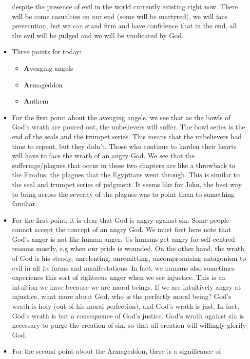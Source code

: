 \begin{itemize}
{\begin{itemize}
{    despite the presence of evil in the world currently existing right now.
    There will be come casualties on our end (some will be martyred), we will
    face persecution, but we can stand firm and have confidence that in the end, all the evil will be judged and we will be vindicated by God. }
  \end{itemize}}
  \item{Three points for today:
  \begin{itemize}
    \item{\textbf{A}venging angels}
    \item{\textbf{A}rmageddon}
    \item{\textbf{A}nthem}
  \end{itemize}}
  \item{For the first point about the avenging angels, we see that as the
  bowls of God's wrath are poured out, the unbelievers will suffer.  The bowl
  series is the end of the seals and the trumpet series.  This means that the
  unbelievers had time to repent, but they didn't.  Those who continue to
  harden their hearts will have to face the wrath of an angry God.  We see
  that the sufferings/plagues that occur in these two chapters are like a
  throwback to the Exodus, the plagues that the Egyptians went through.  This
  is similar to the seal and trumpet series of judgment.  It seems like for
  John, the best way to bring across the severity of the plagues was to point
  them to something familiar. }
  \item{For the first point, it is clear that God is angry against sin.  Some
  people cannot accept the concept of an angry God.  We must first here note
  that God's anger is not like human anger.  Us humans get angry for
  self-centred reasons mostly, e.g when our pride is wounded.  On the other
  hand, the wrath of God is his steady, unrelenting, unremitting,
  uncompromising antagonism to evil in all its forms and manifestations.  In
  fact, we humans also sometimes experience this sort of righteous anger when
  we see injustice.  This is an intuition we have because we are moral
  beings.  If we are intuitively angry at injustice, what more about God, who
  is the perfectly moral being?  God's wrath is holy (out of his moral
  perfection), and God's wrath is just.  In fact, God's wrath is but a
  consequence of God's justice.  God's wrath against sin is necessary to
  purge the creation of sin, so that all creation will willingly glorify God.
  }
  \item{For the second point about the Armageddon, there is a significance of
}
\end{itemize}
